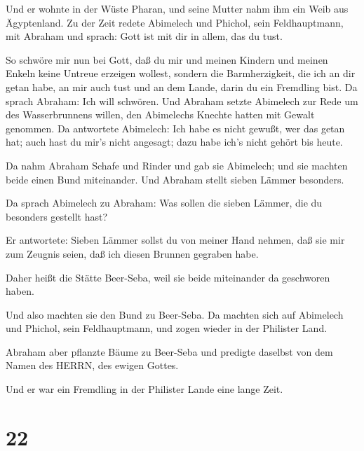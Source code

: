  Und er wohnte in der Wüste Pharan, und seine Mutter nahm
ihm ein Weib aus Ägyptenland.  Zu der Zeit redete Abimelech
und Phichol, sein Feldhauptmann, mit Abraham und sprach: Gott ist mit
dir in allem, das du tust.

 So schwöre mir nun bei Gott, daß du mir und meinen Kindern
und meinen Enkeln keine Untreue erzeigen wollest, sondern die
Barmherzigkeit, die ich an dir getan habe, an mir auch tust und an dem
Lande, darin du ein Fremdling bist.  Da sprach Abraham: Ich
will schwören.  Und Abraham setzte Abimelech zur Rede um
des Wasserbrunnens willen, den Abimelechs Knechte hatten mit Gewalt
genommen.  Da antwortete Abimelech: Ich habe es nicht
gewußt, wer das getan hat; auch hast du mir's nicht angesagt; dazu habe
ich's nicht gehört bis heute.

 Da nahm Abraham Schafe und Rinder und gab sie Abimelech;
und sie machten beide einen Bund miteinander.  Und Abraham
stellt sieben Lämmer besonders.

 Da sprach Abimelech zu Abraham: Was sollen die sieben
Lämmer, die du besonders gestellt hast?

 Er antwortete: Sieben Lämmer sollst du von meiner Hand
nehmen, daß sie mir zum Zeugnis seien, daß ich diesen Brunnen gegraben
habe.

 Daher heißt die Stätte Beer-Seba, weil sie beide
miteinander da geschworen haben.

 Und also machten sie den Bund zu Beer-Seba. Da machten
sich auf Abimelech und Phichol, sein Feldhauptmann, und zogen wieder in
der Philister Land.

 Abraham aber pflanzte Bäume zu Beer-Seba und predigte
daselbst von dem Namen des HERRN, des ewigen Gottes.

 Und er war ein Fremdling in der Philister Lande eine lange
Zeit.

\hypertarget{section-21}{%
\section{22}\label{section-21}}


